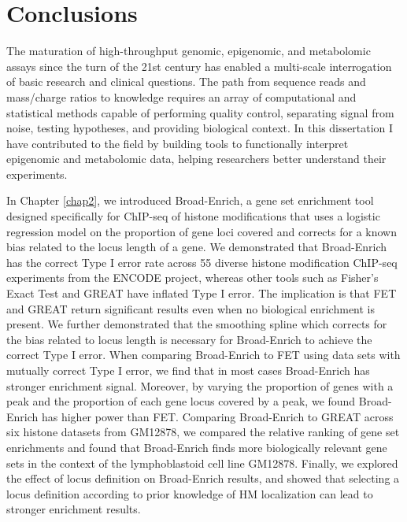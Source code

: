 
\section{Conclusions}
\label{conclusions:general}

The maturation of high-throughput genomic, epigenomic, and metabolomic assays since the turn of the 21st century has enabled a multi-scale interrogation of basic research and clinical questions. The path from sequence reads and mass/charge ratios to knowledge requires an array of computational and statistical methods capable of performing quality control, separating signal from noise, testing hypotheses, and providing biological context. In this dissertation I have contributed to the field by building tools to functionally interpret epigenomic and metabolomic data, helping researchers better understand their experiments.

In Chapter \ref{chap2}, we introduced Broad-Enrich, a gene set enrichment tool designed specifically for ChIP-seq of histone modifications that uses a logistic regression model on the proportion of gene loci covered and corrects for a known bias related to the locus length of a gene. We demonstrated that Broad-Enrich has the correct Type I error rate across 55 diverse histone modification ChIP-seq experiments from the ENCODE project, whereas other tools such as Fisher's Exact Test and GREAT have inflated Type I error. The implication is that FET and GREAT return significant results even when no biological enrichment is present. We further demonstrated that the smoothing spline which corrects for the bias related to locus length is necessary for Broad-Enrich to achieve the correct Type I error. When comparing Broad-Enrich to FET using data sets with mutually correct Type I error, we find that in most cases Broad-Enrich has stronger enrichment signal. Moreover, by varying the proportion of genes with a peak and the proportion of each gene locus covered by a peak, we found Broad-Enrich has higher power than FET. Comparing Broad-Enrich to GREAT across six histone datasets from GM12878, we compared the relative ranking of gene set enrichments and found that Broad-Enrich finds more biologically relevant gene sets in the context of the lymphoblastoid cell line GM12878. Finally, we explored the effect of locus definition on Broad-Enrich results, and showed that selecting a locus definition according to prior knowledge of HM localization can lead to stronger enrichment results.


